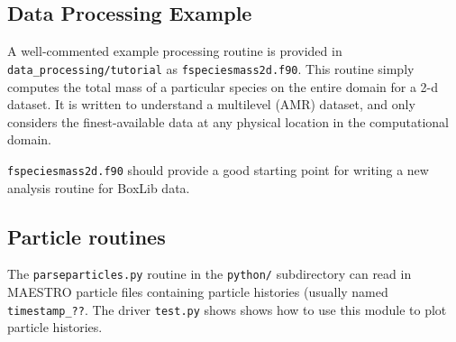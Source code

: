 \subsection{Data Processing Example}

A well-commented example processing routine is provided in {\tt
  data\_processing/tutorial} as {\tt fspeciesmass2d.f90}.  This
routine simply computes the total mass of a particular species on the
entire domain for a 2-d dataset.  It is written to understand a
multilevel (AMR) dataset, and only considers the finest-available data
at any physical location in the computational domain.  

{\tt fspeciesmass2d.f90} should provide a good starting point for
writing a new analysis routine for BoxLib data.

\subsection{Particle routines}

The {\tt parseparticles.py} routine in the {\tt python/} subdirectory
can read in MAESTRO particle files containing particle histories
(usually named {\tt timestamp\_??}.  The driver {\tt test.py} shows
shows how to use this module to plot particle histories.


